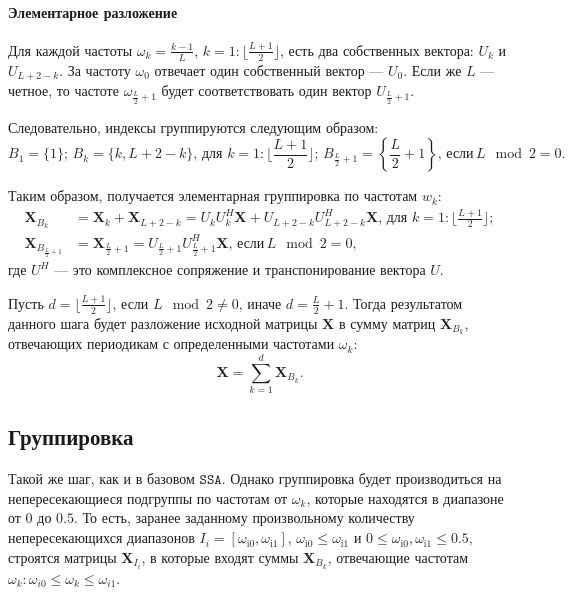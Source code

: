 \documentclass[12pt, specialist, subf
]{disser}
\theoremstyle{definition}
\newcommand{\SSA}{\texttt{SSA}}
\begin{document}
\paragraph{Элементарное разложение \newline}

Для каждой частоты $\omega_k = \frac{k-1}{L}$, $k = 1:\lfloor \frac{L+1}{2} \rfloor$, есть два собственных вектора: $U_k$ и $U_{L+2-k}$. За частоту $\omega_0$ отвечает один собственный вектор --- $U_0$. Если же $L$ --- четное, то частоте $\omega_{\frac{L}{2} + 1}$ будет соответствовать один вектор $U_{\frac{L}{2}+1}$.

Следовательно, индексы группируются следующим образом:
\begin{equation*}
	B_1 = \{1\}; \, B_k = \{k, L+2-k\}, \,  \text{для } k = 1:\lfloor \frac{L+1}{2}\rfloor; \,
	B_{\frac{L}{2} + 1} = \left\{ \frac{L}{2} + 1 \right\}, \, \text{если} \, L\mod 2 = 0.
\end{equation*}

Таким образом, получается элементарная группировка по частотам $w_k$:
\begin{align*}
	\mathbf X_{B_k}                 & = \mathbf X_k + \mathbf X_{L+2-k} = U_k U_k^H \mathbf X + U_{L+2-k} U_{L+2-k}^H \mathbf X, \,  \text{для } k = 1:\lfloor \frac{L+1}{2}\rfloor; \\
	\mathbf X_{B_{\frac{L}{2} + 1}} & = \mathbf X_{{\frac{L}{2} + 1}} =
	U_{\frac{L}{2} + 1} U_{\frac{L}{2} + 1}^H \mathbf X, \, \text{если} \, L \mod 2 = 0,
\end{align*}
где $U^H$ --- это комплексное сопряжение и транспонирование вектора $U$.

Пусть $d = \lfloor \frac{L+1}{2} \rfloor$, если $L \mod 2 \not = 0$, иначе $d = \frac{L}{2} + 1$. Тогда результатом данного шага будет разложение исходной матрицы $\mathbf X$ в сумму матриц $\mathbf{X}_{B_k}$, отвечающих периодикам с определенными частотами $\omega_k$:
\begin{equation*}
	\mathbf X = \sum\limits_{k=1}^d \mathbf{X}_{B_k} .
\end{equation*}


\subsection*{Группировка}
Такой же шаг, как и в базовом $\SSA$. Однако группировка будет производиться на непересекающиеся подгруппы по частотам от $\omega_k$, которые находятся в диапазоне от $0$ до $0.5$. То есть, заранее заданному произвольному количеству непересекающихся диапазонов $I_i = \left[\omega_{\mathrm{i0}}, \omega_{\mathrm{i1}}\right]$, $\omega_{\mathrm{i0}} \leq \omega_{\mathrm{i1}}$ и $0 \leq \omega_{\mathrm{i0}}, \omega_{\mathrm{i1}} \leq 0.5$, строятся матрицы $\mathbf X_{I_i}$, в которые входят суммы $\mathbf X_{B_k}$, отвечающие частотам $\omega_k: \omega_{i0} \leq \omega_k \leq \omega_{i1}$.
\end{document}
